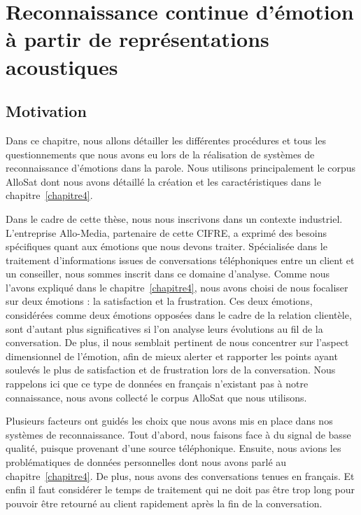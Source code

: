 \chapter{Reconnaissance continue d’émotion à partir de représentations acoustiques}
\label{chapitre5}

\section{Motivation}
Dans ce chapitre, nous allons détailler les différentes procédures et tous les questionnements que nous avons eu lors de la réalisation de systèmes de reconnaissance d'émotions dans la parole. Nous utilisons principalement le corpus AlloSat dont nous avons détaillé la création et les caractéristiques dans le chapitre~\ref{chapitre4}.

Dans le cadre de cette thèse, nous nous inscrivons dans un contexte industriel. L'entreprise Allo-Media, partenaire de cette CIFRE, a exprimé des besoins spécifiques quant aux émotions que nous devons traiter. Spécialisée dans le traitement d'informations issues de conversations téléphoniques entre un client et un conseiller, nous sommes inscrit dans ce domaine d'analyse. Comme nous l'avons expliqué dans le chapitre~\ref{chapitre4}, nous avons choisi de nous focaliser sur deux émotions : la satisfaction et la frustration. Ces deux émotions, considérées comme deux émotions opposées dans le cadre de la relation clientèle, sont d'autant plus significatives si l'on analyse leurs évolutions au fil de la conversation. De plus, il nous semblait pertinent de nous concentrer sur l'aspect dimensionnel de l'émotion, afin de mieux alerter et rapporter les points ayant soulevés le plus de satisfaction et de frustration lors de la conversation. Nous rappelons ici que ce type de données en français n'existant pas à notre connaissance, nous avons collecté le corpus AlloSat que nous utilisons.

Plusieurs facteurs ont guidés les choix que nous avons mis en place dans nos systèmes de reconnaissance. Tout d'abord, nous faisons face à du signal de basse qualité, puisque provenant d'une source téléphonique. Ensuite, nous avions les problématiques de données personnelles dont nous avons parlé au chapitre~\ref{chapitre4}. De plus, nous avons des conversations tenues en français. Et enfin il faut considérer le temps de traitement qui ne doit pas être trop long pour pouvoir être retourné au client rapidement après la fin de la conversation.

